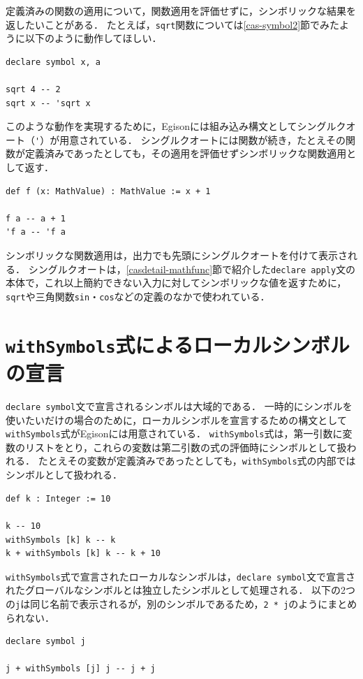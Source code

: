 定義済みの関数の適用について，関数適用を評価せずに，シンボリックな結果を返したいことがある．
たとえば，\lstinline{sqrt}関数については\ref{cas-symbol2}節でみたように以下のように動作してほしい．
\begin{lstlisting}[language=egison,numbers=none]
declare symbol x, a

sqrt 4 -- 2
sqrt x -- 'sqrt x
\end{lstlisting}
このような動作を実現するために，Egisonには組み込み構文としてシングルクオート（\lstinline{'}）が用意されている．
シングルクオートには関数が続き，たとえその関数が定義済みであったとしても，その適用を評価せずシンボリックな関数適用として返す．
\begin{lstlisting}[language=egison,numbers=none]
def f (x: MathValue) : MathValue := x + 1

f a -- a + 1
'f a -- 'f a
\end{lstlisting}
シンボリックな関数適用は，出力でも先頭にシングルクオートを付けて表示される．
シングルクオートは，\ref{casdetail-mathfunc}節で紹介した\lstinline{declare apply}文の本体で，これ以上簡約できない入力に対してシンボリックな値を返すために，\lstinline{sqrt}や三角関数\lstinline{sin}・\lstinline{cos}などの定義のなかで使われている．

\section{\texttt{withSymbols}式によるローカルシンボルの宣言}\label{mexpr-withsym}

\lstinline{declare symbol}文で宣言されるシンボルは大域的である．
一時的にシンボルを使いたいだけの場合のために，ローカルシンボルを宣言するための構文として\lstinline{withSymbols}式がEgisonには用意されている．
\lstinline{withSymbols}式は，第一引数に変数のリストをとり，これらの変数は第二引数の式の評価時にシンボルとして扱われる．
たとえその変数が定義済みであったとしても，\lstinline{withSymbols}式の内部ではシンボルとして扱われる．
\begin{lstlisting}[language=egison,numbers=none]
def k : Integer := 10

k -- 10
withSymbols [k] k -- k
k + withSymbols [k] k -- k + 10
\end{lstlisting}

\lstinline{withSymbols}式で宣言されたローカルなシンボルは，\lstinline{declare symbol}文で宣言されたグローバルなシンボルとは独立したシンボルとして処理される．
以下の2つの\lstinline{j}は同じ名前で表示されるが，別のシンボルであるため，\lstinline{2 * j}のようにまとめられない．
\begin{lstlisting}[language=egison,numbers=none]
declare symbol j

j + withSymbols [j] j -- j + j
\end{lstlisting}

